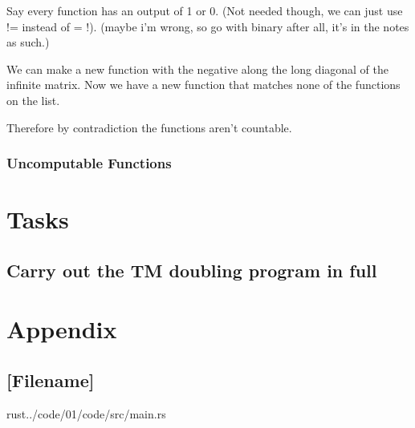 \documentclass{article}
\begin{document}
Say every function has an output of 1 or 0. (Not needed though, we can just use != instead of = !). (maybe i'm wrong, so go with binary after all, it's in the notes as such.)

We can make a new function with the negative along the long diagonal of the infinite matrix.
Now we have a new function that matches none of the functions on the list.

Therefore by contradiction the functions aren't countable.

\subsubsection{Uncomputable Functions}

\section{Tasks}

\subsection{Carry out the TM doubling program in full}

\pagebreak
%

\section*{Appendix}

\subsection*{[Filename]}
\begin{inputminted}{rust}{../code/01/code/src/main.rs}
\end{inputminted}
\end{document}
